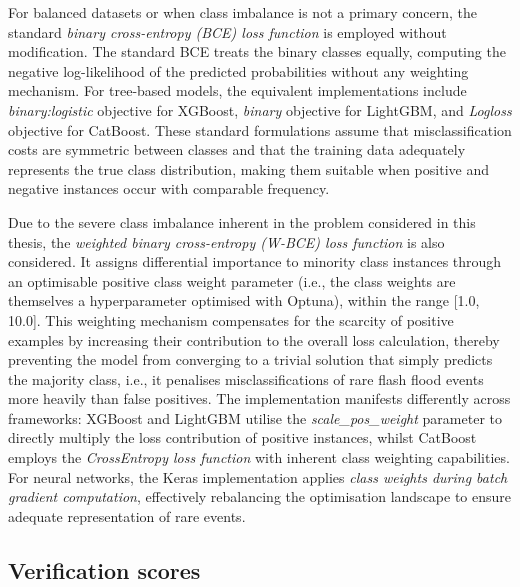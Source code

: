 For  balanced datasets or when class imbalance is not a primary concern, the standard \textit{binary cross-entropy (BCE) loss function} is employed without modification. The standard BCE treats the binary classes equally, computing the negative log-likelihood of the predicted probabilities without any weighting mechanism. For tree-based models, the equivalent implementations include \textit{binary:logistic} objective for XGBoost, \textit{binary} objective for LightGBM, and \textit{Logloss} objective for CatBoost. These standard formulations assume that misclassification costs are symmetric between classes and that the training data adequately represents the true class distribution, making them suitable when positive and negative instances occur with comparable frequency.

Due  to the severe class imbalance inherent in the problem considered in this thesis, the \textit{weighted binary cross-entropy (W-BCE) loss function} is also considered. It assigns differential importance to minority class instances through an optimisable positive class weight parameter (i.e., the class weights are themselves a hyperparameter optimised with Optuna), within the range [1.0, 10.0]. This weighting mechanism compensates for the scarcity of positive examples by increasing their contribution to the overall loss calculation, thereby preventing the model from converging to a trivial solution that simply predicts the majority class, i.e., it penalises misclassifications of rare flash flood events more heavily than false positives. The implementation manifests differently across frameworks: XGBoost and LightGBM utilise the \textit{scale\_pos\_weight} parameter to directly multiply the loss contribution of positive instances, whilst CatBoost employs the \textit{CrossEntropy loss function} with inherent class weighting capabilities. For neural networks, the Keras implementation applies \textit{class weights during batch gradient computation}, effectively rebalancing the optimisation landscape to ensure adequate representation of rare events.


\subsection{Verification scores}



